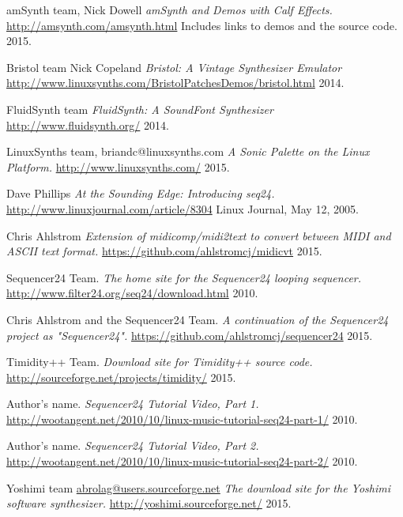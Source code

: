 \begin{thebibliography}{99}

   amSynth team, Nick Dowell
   \emph{amSynth and Demos with Calf Effects.}
   \url{http://amsynth.com/amsynth.html}
   Includes links to demos and the source code.
   2015.

   Bristol team Nick Copeland
   \emph{Bristol: A Vintage Synthesizer Emulator}
   \url{http://www.linuxsynths.com/BristolPatchesDemos/bristol.html}
   2014.

   FluidSynth team
   \emph{FluidSynth: A SoundFont Synthesizer}
   \url{http://www.fluidsynth.org/}
   2014.

   LinuxSynths team, briandc@linuxsynths.com
   \emph{A Sonic Palette on the Linux Platform.}
   \url{http://www.linuxsynths.com/}
   2015.

   Dave Phillips
   \emph{At the Sounding Edge: Introducing seq24.}
   \url{http://www.linuxjournal.com/article/8304}
   Linux Journal, May 12, 2005.

   Chris Ahlstrom
   \emph{Extension of midicomp/midi2text to convert between MIDI and ASCII text format.}
   \url{https://github.com/ahlstromcj/midicvt}
   2015.

   Sequencer24 Team.
   \emph{The home site for the Sequencer24 looping sequencer.}
   \url{http://www.filter24.org/seq24/download.html}
   2010.

   Chris Ahlstrom and the Sequencer24 Team.
   \emph{A continuation of the Sequencer24 project as "Sequencer24".}
   \url{https://github.com/ahlstromcj/sequencer24}
   2015.

   Timidity++ Team.
   \emph{Download site for Timidity++ source code.}
   \url{http://sourceforge.net/projects/timidity/}
   2015.

   Author's name.
   \emph{Sequencer24 Tutorial Video, Part 1.}
   \url{http://wootangent.net/2010/10/linux-music-tutorial-seq24-part-1/}
   2010.

   Author's name.
   \emph{Sequencer24 Tutorial Video, Part 2.}
   \url{http://wootangent.net/2010/10/linux-music-tutorial-seq24-part-2/}
   2010.

   Yoshimi team \url{abrolag@users.sourceforge.net}
   \emph{The download site for the Yoshimi software synthesizer.}
   \url{http://yoshimi.sourceforge.net/}
   2015.


\end{thebibliography}
